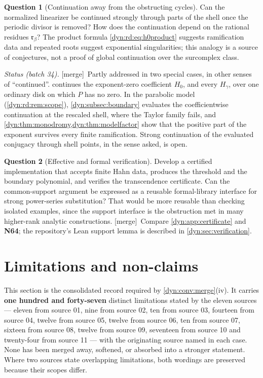 \documentclass[11pt,letterpaper]{article}
\theoremstyle{definition}
\newtheorem{question}[question]{Question}
\theoremstyle{remark}
\newcommand{\mergetag}{\textup{\textsf{\small[merge]}}}%
\numberwithin{equation}{section}
\begin{document}
\begin{question}[Continuation away from the obstructing cycles]
\label{dyn:rd:q:continuation}
Can the normalized linearizer be continued strongly through parts of the
shell once the periodic divisor is removed? How does the continuation
depend on the rational residues $\mathfrak r_\beta$? The product formula
\eqref{dyn:rd:eq:h0product} suggests ramification data and repeated roots
suggest exponential singularities; this analogy is a source of conjectures,
not a proof of global continuation over the surcomplex class.

\emph{Status (batch 34).} \mergetag\ Partly addressed in two special cases,
in other senses of ``continued''.  continues the
exponent-zero coefficient $H_0$, and every $H_\gamma$, over one ordinary
disk on which $P$ has no zero. In the parabolic model
(\cref{dyn:rd:rem:scope}), \cref{dyn:subsec:boundary} evaluates the
coefficientwise continuation at the rescaled shell, where the Taylor family
fails, and \cref{dyn:thm:monodromy,dyn:thm:modelfactor} show that the
positive part of the exponent survives every finite ramification. Strong
continuation of the evaluated conjugacy through shell points, in the sense
asked, is open.
\end{question}

\begin{question}[Effective and formal verification]\label{dyn:rd:q:effective}
Develop a certified implementation that accepts finite Hahn data, produces
the threshold and the boundary polynomial, and verifies the transcendence
certificate. Can the common-support argument be expressed as a reusable
formal-library interface for strong power-series substitution? That would be
more reusable than checking isolated examples, since the support interface
is the obstruction met in many higher-rank analytic constructions.
\mergetag\ Compare \cref{dyn:app:certificate} and \textbf{N64}; the
repository's Lean support lemma is described in \cref{dyn:sec:verification}.
\end{question}

\section{Limitations and non-claims}
\label{dyn:sec:nonclaims}

This section is the consolidated record required by
\cref{dyn:conv:merge}(iv). It carries \textbf{one hundred and forty-seven}
distinct limitations stated by the eleven sources --- eleven from source 01,
nine from source 02, ten from source 03, fourteen from source 04, twelve
from source 05, twelve from source 06, ten from source 07, sixteen from
source 08, twelve from source 09, seventeen from source 10 and twenty-four
from source 11 --- with the originating source named in each case. None has been merged away, softened, or absorbed
into a stronger statement. Where two sources state overlapping limitations,
both wordings are preserved because their scopes differ.
\end{document}
